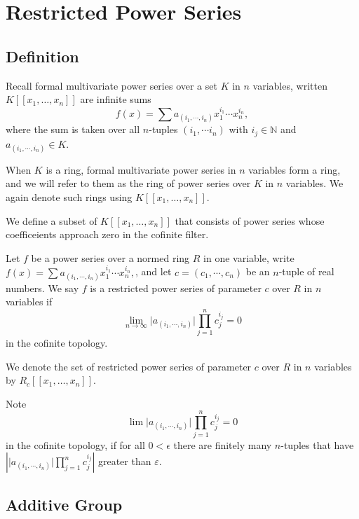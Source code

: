 \chapter{Restricted Power Series}

\section{Definition}

Recall formal multivariate power series over a set $K$ in $n$ variables, written
$K [ \! [ x_1, \dots, x_n ] \! ]$ are infinite sums
\[
  f(x) = \sum a_{(i_1, \cdots, i_n)} x_1^{i_1} \cdots x_n^{i_n},
\]
where the sum is taken over all $n$-tuples $(i_1, \cdots i_n)$ with $i_j \in \mathbb{N}$ and
$a_{(i_1, \cdots, i_n)} \in K$.

When $K$ is a ring, formal multivariate power series in $n$ variables form a ring, and we will refer
to them as the ring of power series over $K$ in $n$ variables. We again denote such
rings using $K [ \! [ x_1, \dots, x_n ] \! ]$.

We define a subset of $K [ \! [ x_1, \dots, x_n ] \! ]$ that consists of power series whose
coefficeients approach zero in the cofinite filter.

\begin{definition}
  \label{IsRestricted}
  \leanok
  Let $f$ be a power series over a normed ring $R$ in one variable, write
  $f(x) = \sum a_{(i_1, \cdots, i_n)} x_1^{i_1} \cdots x_n^{i_n},$, and let
  $c = (c_1, \cdots, c_n)$ be an $n$-tuple of real numbers.
  We say $f$ is a restricted power series of parameter $c$ over $R$ in $n$ variables if
  \[
    \lim_{n \to \infty} \lvert a_{(i_1, \cdots, i_n)} \rvert \prod_{j=1}^{n} c_j^{i_j} = 0
  \]
  in the cofinite topology.

  We denote the set of restricted power series of parameter $c$ over $R$ in $n$ variables by
  $R_c [ \! [ x_1, \dots, x_n ] \! ]$.
\end{definition}

\begin{remark}
  Note
  \[
    \lim \lvert a_{(i_1, \cdots, i_n)} \rvert \prod_{j=1}^{n} c_j^{i_j} = 0
  \]
  in the cofinite topology, if for all $0 < \epsilon$ there are finitely many $n$-tuples that have
  $\left \lvert \lvert a_{(i_1, \cdots, i_n)} \rvert \prod_{j=1}^{n} c_j^{i_j} \right \rvert$
  greater than $\varepsilon$.
\end{remark}

\section{Additive Group}

